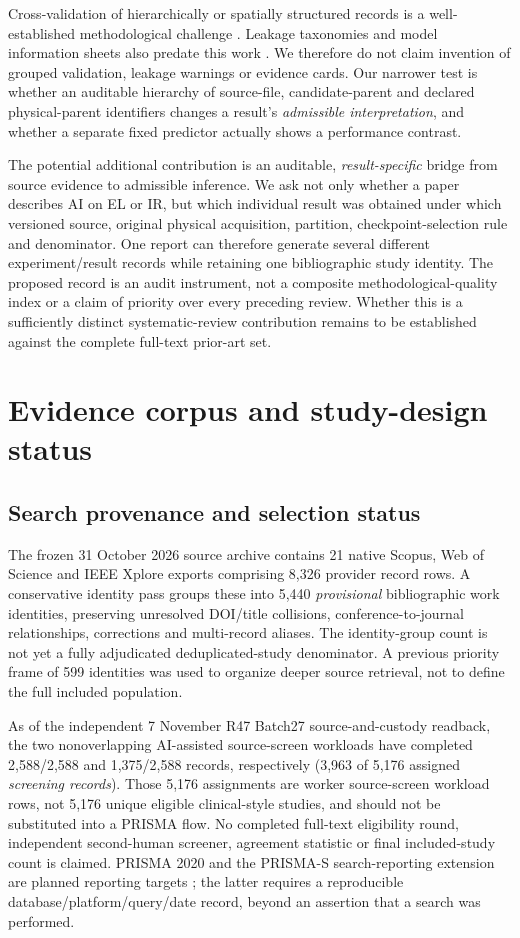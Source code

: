 \documentclass[10pt,a4paper]{article}
\begin{document}
Cross-validation of hierarchically or spatially structured records is a well-established methodological challenge \cite{roberts2017,varoquaux2018}. Leakage taxonomies and model information sheets also predate this work \cite{kapoor2023}. We therefore do not claim invention of grouped validation, leakage warnings or evidence cards. Our narrower test is whether an auditable hierarchy of source-file, candidate-parent and declared physical-parent identifiers changes a result's \emph{admissible interpretation}, and whether a separate fixed predictor actually shows a performance contrast.

The potential additional contribution is an auditable, \emph{result-specific} bridge from source evidence to admissible inference. We ask not only whether a paper describes AI on EL or IR, but which individual result was obtained under which versioned source, original physical acquisition, partition, checkpoint-selection rule and denominator. One report can therefore generate several different experiment/result records while retaining one bibliographic study identity. The proposed record is an audit instrument, not a composite methodological-quality index or a claim of priority over every preceding review. Whether this is a sufficiently distinct systematic-review contribution remains to be established against the complete full-text prior-art set.

\section{Evidence corpus and study-design status}
\subsection{Search provenance and selection status}
The frozen 31 October 2026 source archive contains 21 native Scopus, Web of Science and IEEE Xplore exports comprising 8,326 provider record rows. A conservative identity pass groups these into 5,440 \emph{provisional} bibliographic work identities, preserving unresolved DOI/title collisions, conference-to-journal relationships, corrections and multi-record aliases. The identity-group count is not yet a fully adjudicated deduplicated-study denominator. A previous priority frame of 599 identities was used to organize deeper source retrieval, not to define the full included population.

As of the independent 7 November R47 Batch27 source-and-custody readback, the two nonoverlapping AI-assisted source-screen workloads have completed 2,588/2,588 and 1,375/2,588 records, respectively (3,963 of 5,176 assigned \emph{screening records}). Those 5,176 assignments are worker source-screen workload rows, not 5,176 unique eligible clinical-style studies, and should not be substituted into a PRISMA flow. No completed full-text eligibility round, independent second-human screener, agreement statistic or final included-study count is claimed. PRISMA 2020 and the PRISMA-S search-reporting extension are planned reporting targets \cite{prisma,prismas}; the latter requires a reproducible database/platform/query/date record, beyond an assertion that a search was performed.
\end{document}
